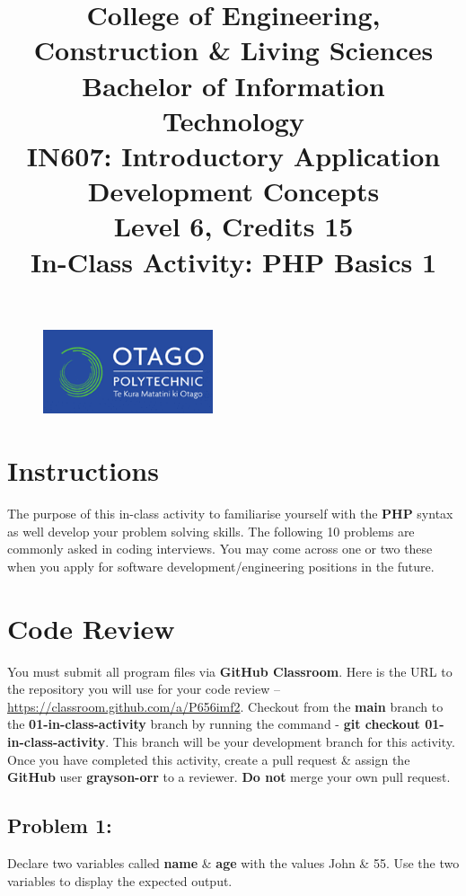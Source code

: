 \documentclass{article}
\author{}
\begin{document}
\begin{figure}
    \centering
    \includegraphics[width=50mm]{../img/logo.png}
\end{figure}

\title{College of Engineering, Construction \& Living Sciences\\Bachelor of Information Technology\\IN607: Introductory Application Development Concepts\\Level 6, Credits 15\\\textbf{In-Class Activity: PHP Basics 1}}
\date{}
\maketitle
 
\section*{Instructions}
The purpose of this in-class activity to familiarise yourself with the \textbf{PHP} syntax as well develop your problem solving skills. The following 10 problems are commonly asked in coding interviews. You may come across one or two these when you apply for software development/engineering positions in the future.

\section*{Code Review}
You must submit all program files via \textbf{GitHub Classroom}. Here is the URL to the repository you will use for your code review – \href{https://classroom.github.com/a/P656imf2}{https://classroom.github.com/a/P656imf2}. Checkout from the \textbf{main} branch to the \textbf{01-in-class-activity} branch by running the command - \textbf{git checkout 01-in-class-activity}. This branch will be your development branch for this activity. Once you have completed this activity, create a pull request \& assign the \textbf{GitHub} user \textbf{grayson-orr} to a reviewer. \textbf{Do not} merge your own pull request.

\subsection*{Problem 1:} 
Declare two variables called \textbf{name} \& \textbf{age} with the values John \& 55. Use the two variables to display the expected output.
\end{document}
